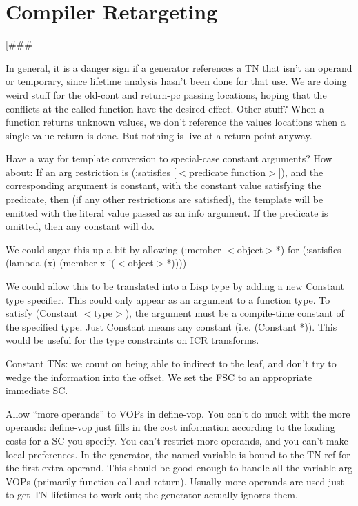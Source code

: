 \part{Compiler Retargeting}

[\#\#\#

In general, it is a danger sign if a generator references a TN that isn't an
operand or temporary, since lifetime analysis hasn't been done for that use.
We are doing weird stuff for the old-cont and return-pc passing locations,
hoping that the conflicts at the called function have the desired effect.
Other stuff?  When a function returns unknown values, we don't reference the
values locations when a single-value return is done.  But nothing is live at a
return point anyway.



Have a way for template conversion to special-case constant arguments?  
How about:
    If an arg restriction is (:satisfies [$<$predicate function$>$]), and the
    corresponding argument is constant, with the constant value satisfying the
    predicate, then (if any other restrictions are satisfied), the template
    will be emitted with the literal value passed as an info argument.  If the
    predicate is omitted, then any constant will do.

    We could sugar this up a bit by allowing (:member $<$object$>$*) for
    (:satisfies (lambda (x) (member x '($<$object$>$*))))

We could allow this to be translated into a Lisp type by adding a new Constant
type specifier.  This could only appear as an argument to a function type.
To satisfy (Constant $<$type$>$), the argument must be a compile-time constant of
the specified type.  Just Constant means any constant (i.e. (Constant *)).
This would be useful for the type constraints on ICR transforms.


Constant TNs: we count on being able to indirect to the leaf, and don't try to
wedge the information into the offset.  We set the FSC to an appropriate
immediate SC.

    Allow ``more operands'' to VOPs in define-vop.  You can't do much with the
    more operands: define-vop just fills in the cost information according to
    the loading costs for a SC you specify.  You can't restrict more operands,
    and you can't make local preferences.  In the generator, the named variable
    is bound to the TN-ref for the first extra operand.  This should be good
    enough to handle all the variable arg VOPs (primarily function call and
    return).  Usually more operands are used just to get TN lifetimes to work
    out; the generator actually ignores them.

